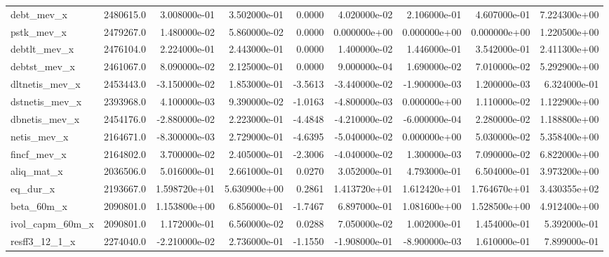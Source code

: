 \documentclass[12pt]{article}
\begin{document}
\begin{landscape}
\begin{longtable}{|l|r|r|r|r|r|r|r|r|}
debt\_mev\_x              &  2480615.0 &  3.008000e-01 &  3.502000e-01 &      0.0000 &  4.020000e-02 &  2.106000e-01 &  4.607000e-01 &  7.224300e+00 \\
pstk\_mev\_x              &  2479267.0 &  1.480000e-02 &  5.860000e-02 &      0.0000 &  0.000000e+00 &  0.000000e+00 &  0.000000e+00 &  1.220500e+00 \\
debtlt\_mev\_x            &  2476104.0 &  2.224000e-01 &  2.443000e-01 &      0.0000 &  1.400000e-02 &  1.446000e-01 &  3.542000e-01 &  2.411300e+00 \\
debtst\_mev\_x            &  2461067.0 &  8.090000e-02 &  2.125000e-01 &      0.0000 &  9.000000e-04 &  1.690000e-02 &  7.010000e-02 &  5.292900e+00 \\
dltnetis\_mev\_x          &  2453443.0 & -3.150000e-02 &  1.853000e-01 &     -3.5613 & -3.440000e-02 & -1.900000e-03 &  1.200000e-03 &  6.324000e-01 \\
dstnetis\_mev\_x          &  2393968.0 &  4.100000e-03 &  9.390000e-02 &     -1.0163 & -4.800000e-03 &  0.000000e+00 &  1.110000e-02 &  1.122900e+00 \\
dbnetis\_mev\_x           &  2454176.0 & -2.880000e-02 &  2.223000e-01 &     -4.4848 & -4.210000e-02 & -6.000000e-04 &  2.280000e-02 &  1.188800e+00 \\
netis\_mev\_x             &  2164671.0 & -8.300000e-03 &  2.729000e-01 &     -4.6395 & -5.040000e-02 &  0.000000e+00 &  5.030000e-02 &  5.358400e+00 \\
fincf\_mev\_x             &  2164802.0 &  3.700000e-02 &  2.405000e-01 &     -2.3006 & -4.040000e-02 &  1.300000e-03 &  7.090000e-02 &  6.822000e+00 \\
aliq\_mat\_x              &  2036506.0 &  5.016000e-01 &  2.661000e-01 &      0.0270 &  3.052000e-01 &  4.793000e-01 &  6.504000e-01 &  3.973200e+00 \\
eq\_dur\_x                &  2193667.0 &  1.598720e+01 &  5.630900e+00 &      0.2861 &  1.413720e+01 &  1.612420e+01 &  1.764670e+01 &  3.430355e+02 \\
beta\_60m\_x              &  2090801.0 &  1.153800e+00 &  6.856000e-01 &     -1.7467 &  6.897000e-01 &  1.081600e+00 &  1.528500e+00 &  4.912400e+00 \\
ivol\_capm\_60m\_x         &  2090801.0 &  1.172000e-01 &  6.560000e-02 &      0.0288 &  7.050000e-02 &  1.002000e-01 &  1.454000e-01 &  5.392000e-01 \\
resff3\_12\_1\_x           &  2274040.0 & -2.210000e-02 &  2.736000e-01 &     -1.1550 & -1.908000e-01 & -8.900000e-03 &  1.610000e-01 &  7.899000e-01 \\

\end{longtable}
\end{landscape}
\end{document}
